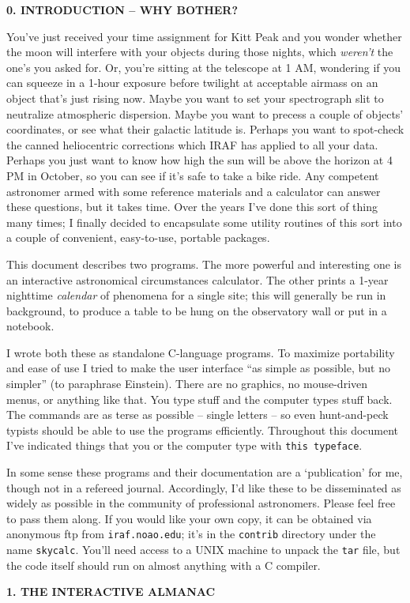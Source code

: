 \centerline{\bf 0. INTRODUCTION -- WHY BOTHER?}
\medskip\par
You've just received your time assignment for Kitt Peak and you wonder
whether the moon will interfere with your objects during those nights,
which {\it weren't} the one's you asked for.
Or, you're sitting at the telescope at 1 AM, wondering if you can squeeze 
in a 1-hour exposure before twilight at acceptable
airmass on an object that's just rising now.  Maybe you want to
set your spectrograph slit to neutralize atmospheric dispersion.
Maybe you want to precess a couple of objects' coordinates, or see
what their galactic latitude is.  Perhaps you want to spot-check the
canned heliocentric corrections which IRAF has applied to all your
data.
Perhaps you just want to know how high the sun will be above the horizon
at 4 PM in October, so you can see if it's safe to take a bike ride.
Any competent astronomer armed with some reference materials and
a calculator
can answer these questions, but it takes time.  Over the years I've
done this sort of thing many times; I finally decided to encapsulate
some utility routines of this sort into a couple of convenient,
easy-to-use, portable packages.
\par
This document describes two programs.  The more
powerful and interesting one is an interactive 
astronomical circumstances calculator. 
The other prints a
1-year nighttime {\it calendar\/} of phenomena for a single site; this
will generally be run in background, to produce a table to be
hung on the observatory wall or put in a notebook.
\par
I wrote both these as standalone C-language programs.  To maximize
portability and ease of use I tried to make the user interface 
``as simple as possible, but no simpler'' (to paraphrase Einstein).  There
are no graphics, no mouse-driven menus, or anything like that.
You type stuff and the computer types stuff back.  
The commands are as terse as possible -- single letters -- so even
hunt-and-peck typists should be able to use the programs efficiently.
Throughout this document I've indicated things that you or the
computer type with {\tt this typeface}.

In some sense these programs and their documentation are 
a `publication' for me, though not in a refereed journal.  Accordingly,
I'd like these to be disseminated as widely as possible in the 
community of professional astronomers.  Please feel free to pass them
along.  If you would like your own copy, it can be obtained via
anonymous ftp from {\tt iraf.noao.edu}; it's in the {\tt contrib} directory
under the name {\tt skycalc}.  You'll need access to a UNIX machine to unpack the
{\tt tar} file, but the code itself should run on almost anything with
a C compiler. 
\par
\bigskip
\centerline{\bf 1. THE INTERACTIVE ALMANAC}


